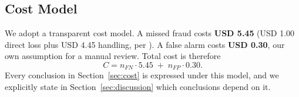 \subsection{Cost Model}

We adopt a transparent cost model. A missed fraud costs
\textbf{USD 5.45} (USD 1.00 direct loss plus USD 4.45 handling, per
\cite{LexisNexis2024}). A false alarm costs \textbf{USD 0.30}, our own
assumption for a manual review. Total cost is therefore
\[
    C = n_{FN} \cdot 5.45 \;+\; n_{FP} \cdot 0.30 .
\]
Every conclusion in Section~\ref{sec:cost} is expressed under this model, and we
explicitly state in Section~\ref{sec:discussion} which conclusions depend on it.
